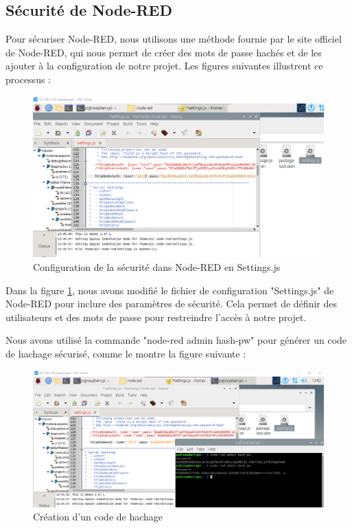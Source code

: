 \subsection{Sécurité de Node-RED}

Pour sécuriser Node-RED, nous utilisons une méthode fournie par le site officiel de Node-RED, qui nous permet de créer des mots de passe hachés et de les ajouter à la configuration de notre projet. Les figures suivantes illustrent ce processus :

\begin{figure}[H]
\centering
\includegraphics[width=14cm]{Images/Node-2.png}
\caption{Configuration de la sécurité dans Node-RED en Settings.js}
\label{Chap4.3.9}
\end{figure}

Dans la figure \ref{Chap4.3.9}, nous avons modifié le fichier de configuration "Settings.js" de Node-RED pour inclure des paramètres de sécurité. Cela permet de définir des utilisateurs et des mots de passe pour restreindre l'accès à notre projet.

Nous avons utilisé la commande "node-red admin hash-pw" pour générer un code de hachage sécurisé, comme le montre la figure suivante :

\begin{figure}[H]
\centering
\includegraphics[width=15cm]{Images/Node-3.png}
\caption{Création d'un code de hachage}
\label{Chap4.3.10}
\end{figure}

